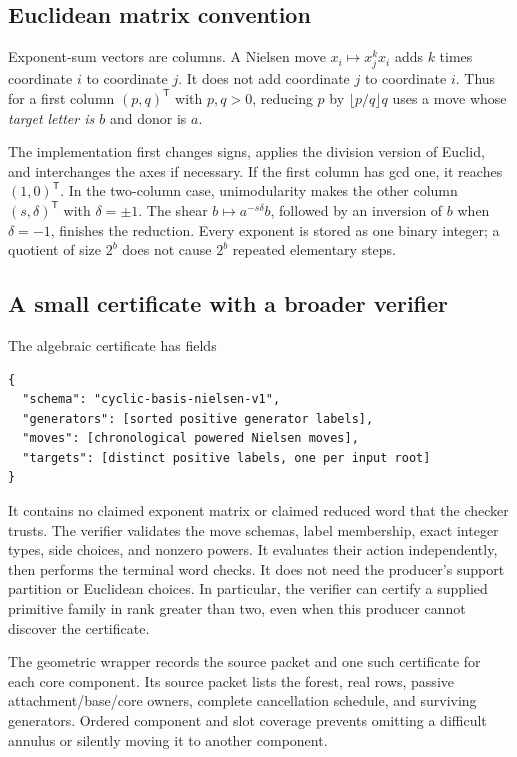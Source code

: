 \documentclass[11pt,a4paper]{article}
\theoremstyle{definition}
\theoremstyle{remark}
\begin{document}
\subsection{Euclidean matrix convention}

Exponent-sum vectors are columns. A Nielsen move
$x_i\mapsto x_j^k x_i$ adds $k$ times coordinate $i$ to coordinate $j$.
It does not add coordinate $j$ to coordinate $i$. Thus for a first column
$(p,q)^{\mathsf T}$ with $p,q>0$, reducing $p$ by $\lfloor p/q\rfloor q$
uses a move whose \emph{target letter is $b$} and donor is $a$.

The implementation first changes signs, applies the division version of
Euclid, and interchanges the axes if necessary. If the first column has
gcd one, it reaches $(1,0)^{\mathsf T}$. In the two-column case,
unimodularity makes the other column $(s,\delta)^{\mathsf T}$ with
$\delta=\pm1$. The shear $b\mapsto a^{-s\delta}b$, followed by an inversion
of $b$ when $\delta=-1$, finishes the reduction. Every exponent is stored as
one binary integer; a quotient of size $2^b$ does not cause $2^b$ repeated
elementary steps.

\subsection{A small certificate with a broader verifier}

The algebraic certificate has fields
\begin{lstlisting}
{
  "schema": "cyclic-basis-nielsen-v1",
  "generators": [sorted positive generator labels],
  "moves": [chronological powered Nielsen moves],
  "targets": [distinct positive labels, one per input root]
}
\end{lstlisting}

It contains no claimed exponent matrix or claimed reduced word that the
checker trusts. The verifier validates the move schemas, label membership,
exact integer types, side choices, and nonzero powers. It evaluates their
action independently, then performs the terminal word checks. It does not
need the producer's support partition or Euclidean choices. In particular,
the verifier can certify a supplied primitive family in rank greater than
two, even when this producer cannot discover the certificate.

The geometric wrapper records the source packet and one such certificate
for each core component. Its source packet lists the forest, real rows,
passive attachment/base/core owners, complete cancellation schedule, and
surviving generators. Ordered component and slot coverage prevents omitting
a difficult annulus or silently moving it to another component.
\end{document}
